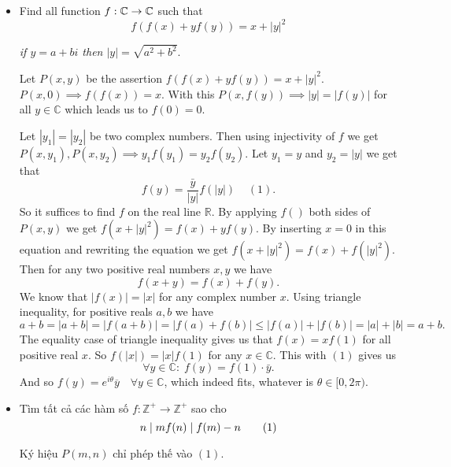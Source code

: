 \documentclass[11pt]{scrartcl}
\begin{document}
\begin{itemize}[label=, leftmargin=0em, itemsep=0.5em]
\begin{sol}
\begin{proof}
            Nhưng theo  thì $f$ không bị chặn trên và $\blim_{x \to +\infty}f(x) = +\infty$ nên dẫn tới vô lý.

            Suy ra $q = 1$ hay $d = 0 \ra a = b$. Thế nên $f$ đơn ánh trên $\bb{R^+}$.
        \end{proof}

        Từ $(1)$ thay $P\left(x,\frac{y}{f(x)}\right)$ suy ra \[x + f(y + 1) = xf\left(x + \frac{y}{f(x)}\right) + \frac{y}{f(x)}f(y) ,\xyro \]

        Cho $x = y = 1$ ta được $f(2) = f(1 + \frac{1}{f(1)})$. Vì $f$ đơn ánh nên $f(1) = 1$. 

        Từ $(1)$ thay $P(1,x) \ra f(x) = \frac{1}{x}, \xro$. Thử lại thì thỏa mãn. Vậy hàm duy nhất thỏa mãn là $\boxed{f(x) = \frac{1}{x}, \xro}$. 
       \end{sol}
       \item \begin{bt}
        Find all function $f: \mathbb{C} \to \mathbb{C}$ such that 
        \[f(f(x)+yf(y))=x+|y|^2\]

        \textit{if $y = a + bi$ then $|y| = \sqrt{a^2 + b^2}$}.
    \end{bt}
    \begin{sol}
        Let $P(x,y)$ be the assertion $f(f(x)+yf(y))=x+|y|^2$.
        $P(x,0) \implies f(f(x))=x$. With this $P(x,f(y)) \implies |y| = |f(y)|$ for all $y\in \mathbb{C}$ which leads us to $f(0)=0$.

        Let $|y_{1}|=|y_{2}|$ be two complex numbers. Then using injectivity of $f$ we get
        $P(x,y_{1}), P(x,y_{2}) \implies y_{1}f(y_{1}) = y_{2}f(y_{2})$. Let $y_{1} =y$ and $y_{2} = |y|$ we get that
        $$f(y) = \dfrac{\bar{y}}{|y|}f(|y|)\; \;\;\;(1).$$
        So it suffices to find $f$ on the real line $\mathbb{R}$. By applying $f()$ both sides of $P(x,y)$ we get $f(x+|y|^2)=f(x)+yf(y)$. By inserting $x=0$ in this equation and rewriting the equation we get
        $f(x+|y|^{2})=f(x)+f(|y|^{2})$. Then for any two positive real numbers $x,y$ we have
        $$f(x+y)=f(x)+f(y) .$$We know that $|f(x)|=|x|$ for any complex number $x$. Using triangle inequality, for positive reals $a,b$ we have
        $$a+b = |a+b| = |f(a+b)| = |f(a)+f(b)| \leq |f(a)| +  |f(b)| = |a| + |b| = a+b.$$The equality case of triangle inequality gives us that $f(x)=xf(1)$ for all positive real $x$. So $f(|x|)= |x|f(1)$ for any $x\in \mathbb{C}$. This with $(1)$ gives us
        $$\forall y\in \mathbb{C}:\;f(y) = f(1)\cdot \bar{y}.$$And so $\boxed{f(y)=e^{i\theta}\overline y\quad\forall y\in\mathbb C}$, which indeed fits, whatever is $\theta\in[0,2\pi)$.
    \end{sol}
    \item \begin{bt}
        Tìm tất cả các hàm số $f: \mathbb{Z}^+\rightarrow \mathbb{Z}^+$ sao cho 
        \[
             n\mid m \lra f(n) \mid f(m) - n \tag{1}
        \]
    \end{bt}
    \begin{sol}
        Ký hiệu $P(m,n)$ chỉ phép thế vào $(1)$. 
        

\end{sol}
\end{itemize}
\end{document}

